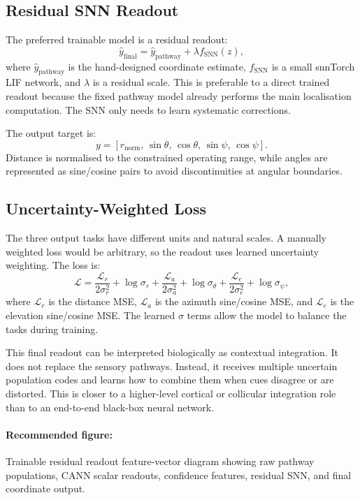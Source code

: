 \subsection{Residual SNN Readout}

The preferred trainable model is a residual readout:
\begin{equation}
    \hat{y}_{\text{final}} = \hat{y}_{\text{pathway}} + \lambda f_{\text{SNN}}(z),
\end{equation}
where $\hat{y}_{\text{pathway}}$ is the hand-designed coordinate estimate, $f_{\text{SNN}}$ is a small snnTorch LIF network, and $\lambda$ is a residual scale. This is preferable to a direct trained readout because the fixed pathway model already performs the main localisation computation. The SNN only needs to learn systematic corrections.

The output target is:
\begin{equation}
    y =
    \left[
    r_{\text{norm}},\,
    \sin \theta,\,
    \cos \theta,\,
    \sin \psi,\,
    \cos \psi
    \right].
\end{equation}
Distance is normalised to the constrained operating range, while angles are represented as sine/cosine pairs to avoid discontinuities at angular boundaries.

\subsection{Uncertainty-Weighted Loss}

The three output tasks have different units and natural scales. A manually weighted loss would be arbitrary, so the readout uses learned uncertainty weighting. The loss is:
\begin{equation}
    \mathcal{L} =
    \frac{\mathcal{L}_r}{2\sigma_r^2} + \log\sigma_r
    + \frac{\mathcal{L}_a}{2\sigma_a^2} + \log\sigma_{\theta}
    + \frac{\mathcal{L}_e}{2\sigma_e^2} + \log\sigma_{\psi},
\end{equation}
where $\mathcal{L}_r$ is the distance MSE, $\mathcal{L}_a$ is the azimuth sine/cosine MSE, and $\mathcal{L}_e$ is the elevation sine/cosine MSE. The learned $\sigma$ terms allow the model to balance the tasks during training.

This final readout can be interpreted biologically as contextual integration. It does not replace the sensory pathways. Instead, it receives multiple uncertain population codes and learns how to combine them when cues disagree or are distorted. This is closer to a higher-level cortical or collicular integration role than to an end-to-end black-box neural network.

\paragraph{Recommended figure:} Trainable residual readout feature-vector diagram showing raw pathway populations, CANN scalar readouts, confidence features, residual SNN, and final coordinate output.

